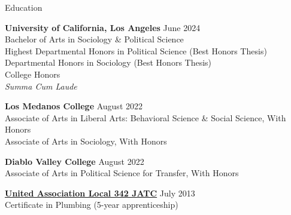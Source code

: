 \documentclass[
	11pt, %
]{resume} %
\begin{document}
\thispagestyle{firstpagestyle}

\begin{samepage}
\begin{rSection}{Education}
	
	\textbf{University of California, Los Angeles} \hfill June 2024\\
	Bachelor of Arts in Sociology \& Political Science\\
	Highest Departmental Honors in Political Science (Best Honors Thesis)\\
	Departmental Honors in Sociology (Best Honors Thesis)\\
	College Honors\\
	\textit{Summa Cum Laude}

	\textbf{Los Medanos College} \hfill August 2022\\ 
	Associate of Arts in Liberal Arts: Behavioral Science \& Social Science, With Honors\\
	Associate of Arts in Sociology, With Honors

	\textbf{Diablo Valley College} \hfill August 2022\\ 
	Associate of Arts in Political Science for Transfer, With Honors
	
	\href{https://ua342.org/training}{\textbf{United Association Local 342 JATC}} \hfill July 2013\\
	Certificate in Plumbing (5-year apprenticeship)
\end{rSection}
\end{samepage}
\end{document}
